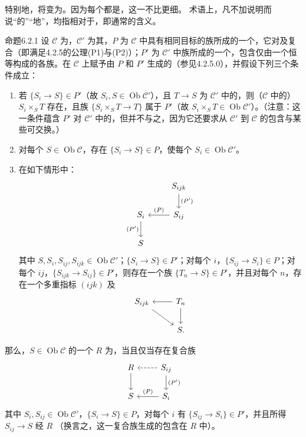 特别地，将变为。因为每个都是，这一不比更细。
术语上，凡不加说明而说“的”“地”，均指相对于，即通常的含义。
\begin{SGAresult}{命题}{6.2.1}
设 $\mathcal C$ 为，$\mathcal C'$ 为其，$P$ 为 $\mathcal C$ 中具有相同目标的族所成的一个，它对及复合（即满足4.2.5的公理(P1)与(P2)）；$P'$ 为 $\mathcal C'$ 中族所成的一个，包含仅由一个恒等构成的各族。在 $\mathcal C$ 上赋予由 $P$ 和 $P'$ 生成的（参见4.2.5.0），并假设下列三个条件成立：
\begin{enumerate}
\item[(a)] 若 $\{S_i\to S\}\in P'$（故 $S_i,S\in\operatorname{Ob}\mathcal C'$），且 $T\to S$ 为 $\mathcal C'$ 中的，则（$\mathcal C$ 中的） $S_i\times_S T$ 存在，且族 $\{S_i\times_S T\to T\}$ 属于 $P'$（故 $S_i\times_S T\in\operatorname{Ob}\mathcal C'$）。（注意：这一条件蕴含 $P'$ 对 $\mathcal C'$ 中的，但并不与之，因为它还要求从 $\mathcal C'$ 到 $\mathcal C$ 的包含与某些可交换。）
\item[(b)] 对每个 $S\in\operatorname{Ob}\mathcal C$，存在 $\{S_i\to S\}\in P$，使每个 $S_i\in\operatorname{Ob}\mathcal C'$。
\item[(c)] 在如下情形中：
\[
\begin{tikzcd}
&S_{ijk}\arrow[d,"(P')"]\\
S_i\arrow[d,"(P')"']&S_{ij}\arrow[l,"(P)"']\\
S&
\end{tikzcd}
\]
其中 $S,S_i,S_{ij},S_{ijk}\in\operatorname{Ob}\mathcal C'$；$\{S_i\to S\}\in P'$；对每个 $i$，$\{S_{ij}\to S_i\}\in P$；对每个 $ij$，$\{S_{ijk}\to S_{ij}\}\in P'$，则存在一个族 $\{T_n\to S\}\in P'$，并且对每个 $n$，存在一个多重指标 $(ijk)$ 及
\[
\begin{tikzcd}
S_{ijk}\arrow[dr]&T_n\arrow[l]\arrow[d]\\
&S.
\end{tikzcd}
\]
\end{enumerate}
那么，$S\in\operatorname{Ob}\mathcal C$ 的一个 $R$ 为，当且仅当存在复合族
\[
\begin{tikzcd}
R\arrow[d]&S_{ij}\arrow[l,dashed]\arrow[d,"(P')"]\\
S&S_i\arrow[l,"(P)"']
\end{tikzcd}
\]
其中 $S_i,S_{ij}\in\operatorname{Ob}\mathcal C'$，$\{S_i\to S\}\in P$，对每个 $i$ 有 $\{S_{ij}\to S_i\}\in P'$，并且所得 $S_{ij}\to S$ 经 $R$ （换言之，这一复合族生成的包含在 $R$ 中）。
\end{SGAresult}
